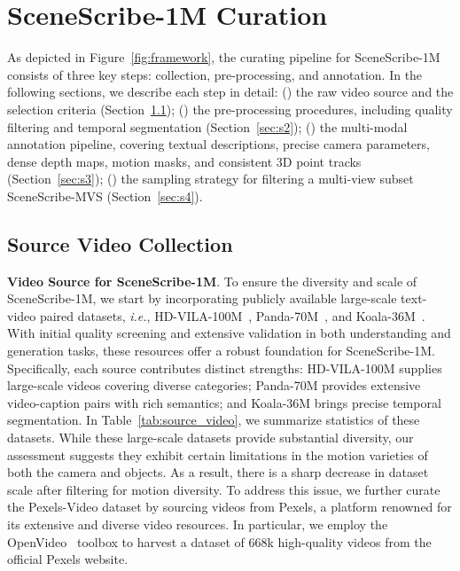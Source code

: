 \section{SceneScribe-1M Curation}




As depicted in Figure~\ref{fig:framework}, the curating pipeline for SceneScribe-1M consists of three key steps: collection, pre-processing, and annotation.
In the following sections, we describe each step in detail:
(\textbf{}) the raw video source and the selection criteria  (Section~\ref{sec:s1});
(\textbf{}) the pre-processing procedures, including quality filtering and temporal segmentation (Section~\ref{sec:s2});
(\textbf{}) the multi-modal annotation pipeline, covering textual descriptions, precise camera parameters, dense depth maps, motion masks, and consistent 3D point tracks (Section~\ref{sec:s3});
(\textbf{}) the sampling strategy for filtering a multi-view subset SceneScribe-MVS  (Section~\ref{sec:s4}).



\subsection{Source Video Collection}
\label{sec:s1}

\noindent\textbf{Video Source for SceneScribe-1M}.
To ensure the diversity and scale of SceneScribe-1M, we start by incorporating publicly available large-scale text-video paired datasets, \textit{i.e.}, HD-VILA-100M~\cite{xue2022advancing}, Panda-70M~\cite{chen2024panda}, and Koala-36M~\cite{wang2025koala}.
With initial quality screening and extensive validation in both understanding and generation tasks, these resources offer a robust foundation for SceneScribe-1M.
Specifically, each source contributes distinct strengths: HD-VILA-100M supplies large-scale videos covering diverse categories; Panda-70M provides extensive video-caption pairs with rich semantics; and Koala-36M brings precise temporal segmentation.
In Table~\ref{tab:source_video}, we summarize statistics of these datasets.
While these large-scale datasets provide substantial diversity, our assessment suggests they exhibit certain limitations in the motion varieties of both the camera and objects.
As a result, there is a sharp decrease in dataset scale after filtering for motion diversity.
To address this issue, we further curate the Pexels-Video dataset by sourcing videos from Pexels, a platform renowned for its extensive and diverse video resources.
In particular, we employ the OpenVideo~\cite{openvideo} toolbox to harvest a dataset of $668$k high-quality videos from the official Pexels website.

